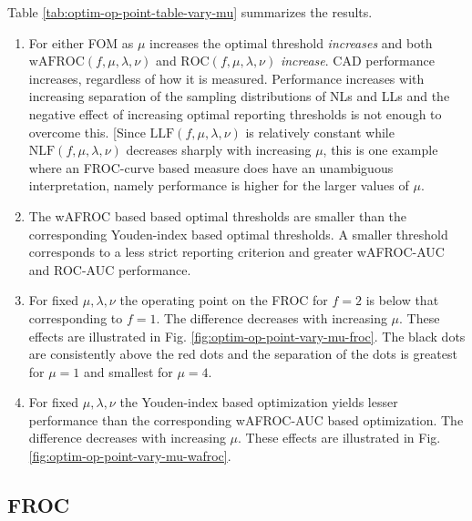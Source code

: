 \documentclass[
]{book}
\begin{document}
Table \ref{tab:optim-op-point-table-vary-mu} summarizes the results.

\begin{enumerate}
\def\labelenumi{\arabic{enumi}.}
\item
  For either FOM as \(\mu\) increases the optimal threshold \emph{increases} and both \(\text{wAFROC} \left ( f, \mu, \lambda, \nu \right )\) and \(\text{ROC} \left ( f, \mu, \lambda, \nu \right )\) \emph{increase}. CAD performance increases, regardless of how it is measured. Performance increases with increasing separation of the sampling distributions of NLs and LLs and the negative effect of increasing optimal reporting thresholds is not enough to overcome this. {[}Since \(\text{LLF} \left ( f, \mu, \lambda, \nu \right )\) is relatively constant while \(\text{NLF} \left ( f, \mu, \lambda, \nu \right )\) decreases sharply with increasing \(\mu\), this is one example where an FROC-curve based measure does have an unambiguous interpretation, namely performance is higher for the larger values of \(\mu\).
\item
  The wAFROC based based optimal thresholds are smaller than the corresponding Youden-index based optimal thresholds. A smaller threshold corresponds to a less strict reporting criterion and greater wAFROC-AUC and ROC-AUC performance.
\item
  For fixed \(\mu, \lambda, \nu\) the operating point on the FROC for \(f = 2\) is below that corresponding to \(f = 1\). The difference decreases with increasing \(\mu\). These effects are illustrated in Fig. \ref{fig:optim-op-point-vary-mu-froc}. The black dots are consistently above the red dots and the separation of the dots is greatest for \(\mu = 1\) and smallest for \(\mu = 4\).
\item
  For fixed \(\mu, \lambda, \nu\) the Youden-index based optimization yields lesser performance than the corresponding wAFROC-AUC based optimization. The difference decreases with increasing \(\mu\). These effects are illustrated in Fig. \ref{fig:optim-op-point-vary-mu-wafroc}.
\end{enumerate}

\hypertarget{froc-4}{%
\subsection{FROC}\label{froc-4}}
\end{document}
